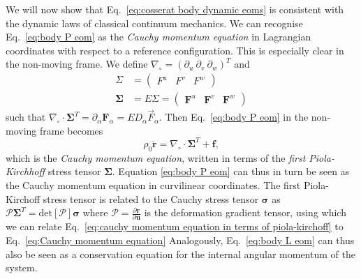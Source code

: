 We will now show that Eq.~\ref{eq:cosserat body dynamic eoms} is consistent with the dynamic laws of classical continuum mechanics. We can recognise Eq.~\ref{eq:body P eom} as the \textit{Cauchy momentum equation} in Lagrangian coordinates with respect to a reference configuration. This is especially clear in the non-moving frame. We define $\nabla_\circ = (\partial_u\ \partial_v\ \partial_w)^T$ and
\begin{subequations} \label{eq:first piola kirchoff}
\begin{align}
\Sigma & = \begin{pmatrix}
F^u & F^v & F^w
\end{pmatrix} \\
\boldsymbol{\Sigma} & = E \Sigma = \begin{pmatrix}
\mathbf{F}^u & \mathbf{F}^v & \mathbf{F}^w
\end{pmatrix}
\end{align}
\end{subequations}
such that $\nabla_\circ \cdot \boldsymbol{\Sigma}^T = \partial_\alpha \mathbf{F}_\alpha = E D_\alpha \vec{F}_\alpha$. Then Eq.~\ref{eq:body P eom} in the non-moving frame becomes
\begin{equation} \label{eq:cauchy momentum equation in terms of piola-kirchoff}
\rho_0 \ddot{\mathbf{r}} = \nabla_\circ \cdot \boldsymbol{\Sigma}^T + \mathbf{f},
\end{equation}
which is the \textit{Cauchy momentum equation}, written in terms of the \textit{first Piola-Kirchhoff} stress tensor $\boldsymbol{\Sigma}$. Equation \ref{eq:body P eom} can thus in turn be seen as the Cauchy momentum equation in curvilinear coordinates. The first Piola-Kirchoff stress tensor is related to the Cauchy stress tensor $\boldsymbol{\sigma}$ as $ \mathcal{P} \boldsymbol{\Sigma}^T = \text{det}[\mathcal{P}]  \boldsymbol{\sigma} $ where $\mathcal{P} = \frac{\partial \mathbf{r}}{\partial \mathbf{u}}$ is the deformation gradient tensor, using which we can relate Eq.~\ref{eq:cauchy momentum equation in terms of piola-kirchoff} to Eq.~\ref{eq:Cauchy momentum equation} Analogously, Eq.~\ref{eq:body L eom} can thus also be seen as a conservation equation for the internal angular momentum of the system.

